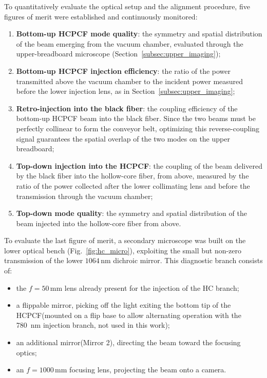 To quantitatively evaluate the optical setup and the alignment procedure, five figures of merit were established and continuously monitored:
\begin{enumerate}
    \item \textbf{Bottom-up HCPCF mode quality}: the symmetry and spatial distribution of the beam emerging from the vacuum chamber, evaluated through the upper-breadboard microscope (Section~\ref{subsec:upper_imaging});
    \item \textbf{Bottom-up HCPCF injection efficiency}: the ratio of the power transmitted above the vacuum chamber to the incident power measured before the lower injection lens, as in Section~\ref{subsec:upper_imaging};
    \item \textbf{Retro-injection into the black fiber}: the coupling efficiency of the bottom-up HCPCF beam into the black fiber. Since the two beams must be perfectly collinear to form the conveyor belt, optimizing this reverse-coupling signal guarantees the spatial overlap of the two modes on the upper breadboard;
    \item \textbf{Top-down injection into the HCPCF}: the coupling of the beam delivered by the black fiber into the hollow-core fiber, from above, measured by the ratio of the power collected after the lower collimating lens and before the transmission through the vacuum chamber;
    \item  \textbf{Top-down mode quality}: the symmetry and spatial distribution of the beam injected into the hollow-core fiber from above.
\end{enumerate}

To evaluate the last figure of merit, a secondary microscope was built on the lower optical bench (Fig.~\ref{fig:hc_micro}), exploiting the small but non-zero transmission of the lower $1064\,\mathrm{nm}$ dichroic mirror. This diagnostic branch consists of:
\begin{itemize}
    \item the $f=50\,\mathrm{mm}$ lens already present for the injection of the HC branch;
    \item a flippable mirror, picking off the light exiting the bottom tip of the HCPCF(mounted on a flip base to allow alternating operation with the 780~nm injection branch, not used in this work);
    \item an additional  mirror(Mirror 2), directing the beam toward the focusing optics;
    \item an $f=1000\,\mathrm{mm}$ focusing lens, projecting the beam onto a camera.
\end{itemize}

